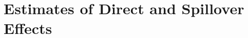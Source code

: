 \documentclass[12pt]{article}
\begin{document}
\section{Estimates of Direct and Spillover Effects}\label{section:results}




\end{document}
